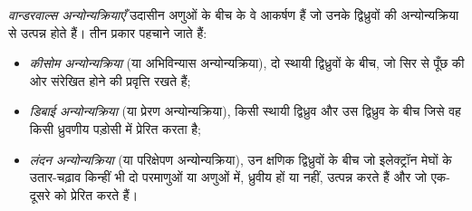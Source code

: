 \begin{definition}[वान्डरवाल्स अन्योन्यक्रियाएँ]\label{def:b1:intermolecular-forces-solvents:vdw}
\emph{वान्डरवाल्स अन्योन्यक्रियाएँ}
उदासीन अणुओं के बीच के वे आकर्षण हैं जो उनके द्विध्रुवों की
अन्योन्यक्रिया से उत्पन्न होते हैं। तीन प्रकार पहचाने जाते हैं:
\begin{itemize}
  \item \emph{कीसोम अन्योन्यक्रिया} (या
        अभिविन्यास अन्योन्यक्रिया), दो स्थायी द्विध्रुवों के बीच, जो
        सिर से पूँछ की ओर संरेखित होने की प्रवृत्ति रखते हैं;
  \item \emph{डिबाई अन्योन्यक्रिया} (या
        प्रेरण अन्योन्यक्रिया), किसी स्थायी द्विध्रुव और उस द्विध्रुव के बीच
        जिसे वह किसी ध्रुवणीय पड़ोसी में प्रेरित करता है;
  \item \emph{लंदन अन्योन्यक्रिया} (या
        परिक्षेपण अन्योन्यक्रिया), उन क्षणिक द्विध्रुवों के बीच जो
        इलेक्ट्रॉन मेघों के उतार-चढ़ाव किन्हीं भी दो परमाणुओं या
        अणुओं में, ध्रुवीय हों या नहीं, उत्पन्न करते हैं और जो एक-दूसरे को प्रेरित करते हैं।
\end{itemize}
\end{definition}

